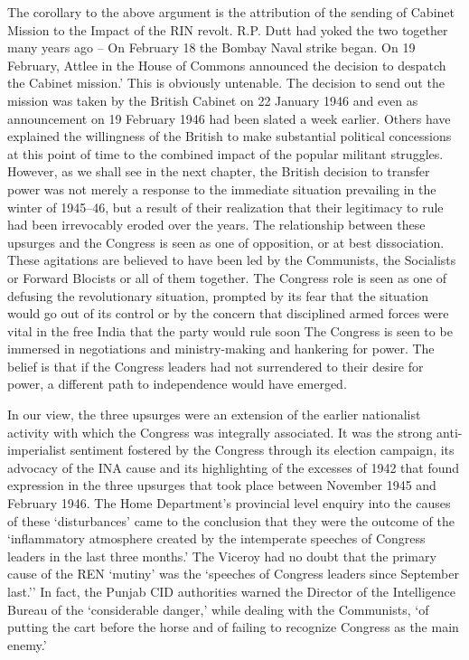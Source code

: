 The corollary to the above argument is the attribution of the sending of Cabinet Mission to the Impact of the RIN revolt. R.P. Dutt had yoked the two together many years ago – On February 18 the Bombay Naval strike began. On 19 February, Attlee in the House of Commons announced the decision to despatch the Cabinet mission.' This is obviously untenable. The decision to send out the mission was taken by the British Cabinet on 22 January 1946 and even as announcement on 19 February 1946 had been slated a week earlier. Others have explained the willingness of the British to make substantial political concessions at this point of time to the combined impact of the popular militant struggles. However, as we shall see in the next chapter, the British decision to transfer power was not merely a response to the immediate situation prevailing in the winter of 1945--46, but a result of their realization that their legitimacy to rule had been irrevocably eroded over the years. The relationship between these upsurges and the Congress is seen as one of opposition, or at best dissociation. These agitations are believed to have been led by the Communists, the Socialists or Forward Blocists or all of them together. The Congress role is seen as one of defusing the revolutionary situation, prompted by its fear that the situation would go out of its control or by the concern that disciplined armed forces were vital in the free India that the party would rule soon The Congress is seen to be immersed in negotiations and ministry-making and hankering for power. The belief is that if the Congress leaders had not surrendered to their desire for power, a different path to independence would have emerged. 

In our view, the three upsurges were an extension of the earlier nationalist activity with which the Congress was integrally associated. It was the strong anti-imperialist sentiment fostered by the Congress through its election campaign, its advocacy of the INA cause and its highlighting of the excesses of 1942 that found expression in the three upsurges that took place between November 1945 and February 1946. The Home Department's provincial level enquiry into the causes of these `disturbances' came to the conclusion that they were the outcome of the `inflammatory atmosphere created by the intemperate speeches of Congress leaders in the last three months.' The Viceroy had no doubt that the primary cause of the REN `mutiny' was the `speeches of Congress leaders since September last.'' In fact, the Punjab CID authorities warned the Director of the Intelligence Bureau of the `considerable danger,' while dealing with the Communists, `of putting the cart before the horse and of failing to recognize Congress as the main enemy.' 

